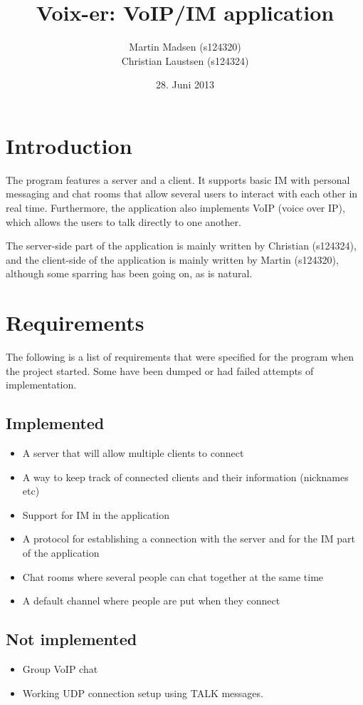 \documentclass[12pt]{rapport}
\title{Voix-er: VoIP/IM application}
\author{
  Martin Madsen (s124320)\\
  Christian Laustsen (s124324)
}
\date{28. Juni 2013}
\begin{document}
\maketitle

\section*{Introduction}
The program features a server and a client. It supports basic IM with
personal messaging and chat rooms that allow several users to interact
with each other in real time. Furthermore, the application also
implements VoIP (voice over IP), which allows the users to talk
directly to one another.\newline


The server-side part of the application is mainly written by Christian
(s124324), and the client-side of the application is mainly written by
Martin (s124320), although some sparring has been going on, as is
natural.


\section*{Requirements}
The following is a list of requirements that were specified for the
program when the project started. Some have been dumped or had failed
attempts of implementation.

\subsection*{Implemented}
\begin{itemize}
  \item A server that will allow multiple clients to connect
  \item A way to keep track of connected clients and their information
    (nicknames etc)
  \item Support for IM in the application
  \item A protocol for establishing a connection with the server and
    for the IM part of the application
  \item Chat rooms where several people can chat together at the same
    time
  \item A default channel where people are put when they connect
\end{itemize}

\subsection*{Not implemented}
\begin{itemize}
  \item Group VoIP chat
  \item Working UDP connection setup using TALK messages.
\end{itemize}
\end{document}
